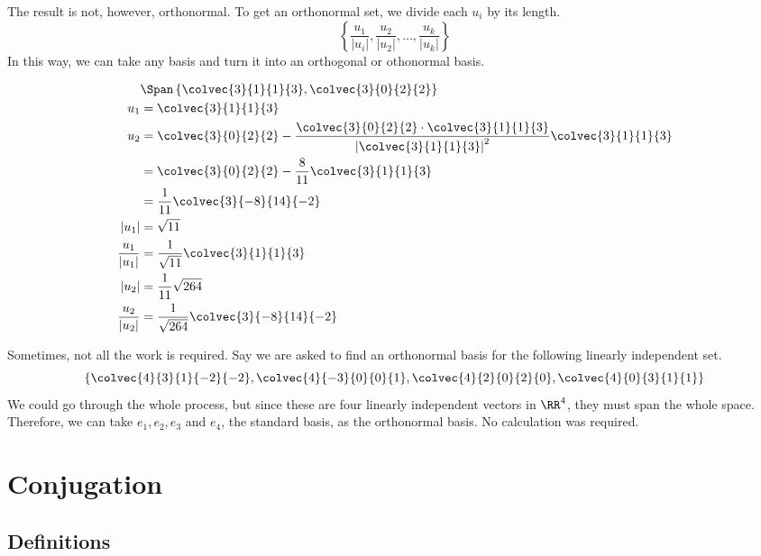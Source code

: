 \documentclass[fleqn]{report}
\begin{document}
The result is not, however, orthonormal. To get an
orthonormal set, we divide each $u_i$ by its length.
\begin{equation*}
\left\{ \frac{u_1}{|u_i|}, \frac{u_2}{|u_2|}, \ldots,
\frac{u_k}{|u_k|} \right\}
\end{equation*}
In this way, we can take any basis and turn it into an
orthogonal or othonormal basis. 

\begin{example}
\begin{align*}
& \Span \left\{ \colvec{3}{1}{1}{3}, \colvec{3}{0}{2}{2}
\right\} \\
u_1 & = \colvec{3}{1}{1}{3} \\
u_2 & = \colvec{3}{0}{2}{2} - \frac{\colvec{3}{0}{2}{2} \cdot
\colvec{3}{1}{1}{3} }{ \left| \colvec{3}{1}{1}{3} \right|^2} 
\colvec{3}{1}{1}{3} \\
& = \colvec{3}{0}{2}{2} - \frac{8}{11} \colvec{3}{1}{1}{3} \\
& = \frac{1}{11} \colvec{3}{-8}{14}{-2} \\
|u_1| & = \sqrt{11} \\
\frac{u_1}{|u_1|} & = \frac{1}{\sqrt{11}} \colvec{3}{1}{1}{3}
\\
|u_2| & = \frac{1}{11} \sqrt{264} \\
\frac{u_2}{|u_2|} & = \frac{1}{\sqrt{264}}
\colvec{3}{-8}{14}{-2} 
\end{align*}
\end{example}

\begin{example}
Sometimes, not all the work is required. Say we are asked to
find an orthonormal basis for the following linearly
independent set.
\begin{equation*}
\left\{ \colvec{4}{3}{1}{-2}{-2}, \colvec{4}{-3}{0}{0}{1},
\colvec{4}{2}{0}{2}{0}, \colvec{4}{0}{3}{1}{1} \right\}
\end{equation*}
We could go through the whole process, but since these are
four linearly independent vectors in $\RR^4$, they must span
the whole space. Therefore, we can take $e_1, e_2, e_3$ and
$e_4$, the standard basis, as the orthonormal basis. No
calculation was required. 
\end{example}

\section{Conjugation}
\label{conjugation}

\subsection{Definitions}
\label{conjugation-definition}
\end{document}
